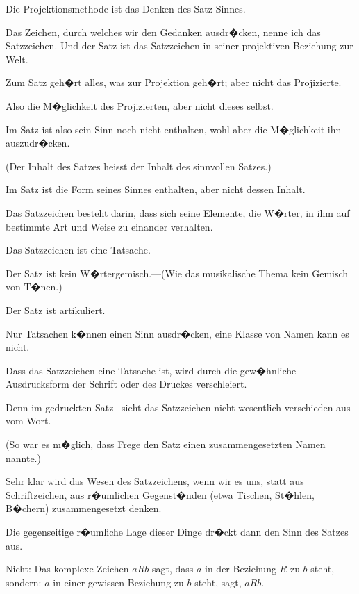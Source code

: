 \begin{propositions}
{Die Projektionsmethode ist das Denken des
Satz-Sinnes.}


{Das Zeichen, durch welches wir den Gedanken
ausdr�cken, nenne ich das Satzzeichen. Und der
Satz ist das Satzzeichen in seiner projektiven
Beziehung zur Welt.}


{Zum Satz geh�rt alles, was zur Projektion
geh�rt; aber nicht das Projizierte.

Also die M�glichkeit des Projizierten, aber nicht
dieses selbst.

Im Satz ist also sein Sinn noch nicht enthalten,
wohl aber die M�glichkeit ihn auszudr�cken.

(\glqq{}Der Inhalt des Satzes\grqq{} heisst der Inhalt des
sinnvollen Satzes.)

Im Satz ist die Form seines Sinnes enthalten,
aber nicht dessen Inhalt.}


{Das Satzzeichen besteht darin, dass sich seine
Elemente, die W�rter, in ihm auf bestimmte Art
und Weise zu einander verhalten.

Das Satzzeichen ist eine Tatsache.}


{Der Satz ist kein W�rtergemisch.---(Wie
das musikalische Thema kein Gemisch von
T�nen.)

Der Satz ist artikuliert.}


{Nur Tatsachen k�nnen einen Sinn ausdr�cken,
eine Klasse von Namen kann es nicht.}


{Dass das Satzzeichen eine Tatsache ist, wird
durch die gew�hnliche Ausdrucksform der Schrift
oder des Druckes verschleiert.

Denn im gedruckten Satz \zumBeispiel\ sieht das Satzzeichen
nicht wesentlich verschieden aus vom
Wort.

(So war es m�glich, dass Frege den Satz einen
zusammengesetzten Namen nannte.)}


{Sehr klar wird das Wesen des Satzzeichens,
wenn wir es uns, statt aus Schriftzeichen, aus
r�umlichen Gegenst�nden (etwa Tischen, St�hlen,
B�chern) zusammengesetzt denken.

Die gegenseitige r�umliche Lage dieser Dinge
dr�ckt dann den Sinn des Satzes aus.}


{Nicht: \glqq{}Das komplexe Zeichen \glq{}$aRb$\grq{} sagt,
dass $a$ in der Beziehung $R$ zu $b$ steht\grqq{}, sondern:
 \glqq{}$a$\grqq{} in einer gewissen Beziehung zu \glqq{}$b$\grqq{}
steht, sagt,  $aRb$.}



\end{propositions}
